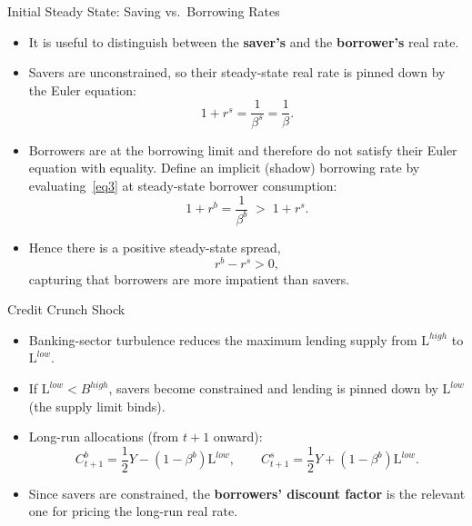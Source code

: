 \documentclass[11pt,aspectratio=169]{beamer}
\begin{document}
\begin{frame}{Initial Steady State: Saving vs.\ Borrowing Rates}
\small
\begin{itemize}
  \item It is useful to distinguish between the \textbf{saver's} and the \textbf{borrower's} real rate.
  \vspace{0.1em}
  \item Savers are unconstrained, so their steady-state real rate is pinned down by the Euler equation:
  \[
    1+r^{s}=\frac{1}{\beta^{s}}=\frac{1}{\beta}.
  \]
  \vspace{0.1em}
  \item Borrowers are at the borrowing limit and therefore do not satisfy their Euler equation with equality.
  Define an implicit (shadow) borrowing rate by evaluating~\eqref{eq3} at steady-state borrower consumption:
  \[
    1+r^{b}=\frac{1}{\beta^{b}}
    \;>\;
    1+r^{s}.
  \]
  \item Hence there is a positive steady-state spread,
  \[
    r^{b}-r^{s}>0,
  \]
  capturing that borrowers are more impatient than savers.
\end{itemize}
\end{frame}


\begin{frame}{Credit Crunch Shock}
\small
\begin{itemize}
  \item Banking-sector turbulence reduces the maximum lending supply from $\mathrm{L}^{high}$ to $\mathrm{L}^{low}$.
  \item If $\mathrm{L}^{low}<B^{high}$, savers become constrained and lending is pinned down by $\mathrm{L}^{low}$ (the supply limit binds).
  \vspace{0.3em}
  \item Long-run allocations (from $t+1$ onward):
  \[
    C_{t+1}^b=\frac{1}{2}Y-(1-\beta^b)\mathrm{L}^{low},
    \qquad
    C_{t+1}^s=\frac{1}{2}Y+(1-\beta^b)\mathrm{L}^{low}.
  \]
  \vspace{0.3em}
  \item Since savers are constrained, the \textbf{borrowers' discount factor} is the relevant one for pricing the long-run real rate.
\end{itemize}
\end{frame}
\end{document}
